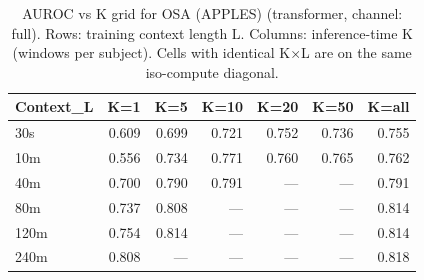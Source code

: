 \begin{table}[ht]
\centering
\caption{AUROC vs K grid for OSA (APPLES) (transformer, channel: full). Rows: training context length L. Columns: inference-time K (windows per subject). Cells with identical K×L are on the same iso-compute diagonal.}
\label{tab:kgrid_osa_binary_apples_postqc_transformer_full}
\begin{tabular}{lrrrrrr}
\toprule
Context_L & K=1 & K=5 & K=10 & K=20 & K=50 & K=all \\
\midrule
30s & 0.609 & 0.699 & 0.721 & 0.752 & 0.736 & 0.755 \\
10m & 0.556 & 0.734 & 0.771 & 0.760 & 0.765 & 0.762 \\
40m & 0.700 & 0.790 & 0.791 & — & — & 0.791 \\
80m & 0.737 & 0.808 & — & — & — & 0.814 \\
120m & 0.754 & 0.814 & — & — & — & 0.814 \\
240m & 0.808 & — & — & — & — & 0.818 \\
\bottomrule
\end{tabular}
\end{table}